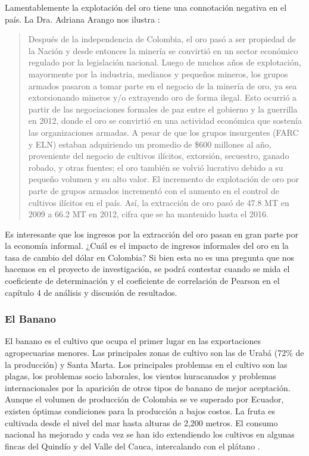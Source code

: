 Lamentablemente la explotación del oro tiene una connotación negativa en el país. La Dra. Adriana Arango nos ilustra \cite{arango_2017}:

\begin{quote}
Después de la independencia de Colombia, el oro pasó a ser propiedad de la Nación y desde entonces la minería se convirtió en un sector económico regulado por la legislación nacional. Luego de muchos años de explotación, mayormente por la industria, medianos y pequeños mineros, los grupos armados pasaron a tomar parte en el negocio de la minería de oro, ya sea extorsionando mineros y/o extrayendo oro de forma ilegal. Esto ocurrió a partir de las negociaciones formales de paz entre el gobierno y la guerrilla en 2012, donde el oro se convirtió en una actividad económica que sostenía las organizaciones armadas. A pesar de que los grupos insurgentes (FARC y ELN) estaban adquiriendo un promedio de \$600 millones al año, proveniente del negocio de cultivos ilícitos, extorsión, secuestro, ganado robado, y otras fuentes; el oro también se volvió lucrativo debido a su pequeño volumen y su alto valor. El incremento de explotación de oro por parte de grupos armados incrementó con el aumento en el control de cultivos ilícitos en el país. Así, la extracción de oro pasó de 47.8 MT en 2009 a 66.2 MT en 2012, cifra que se ha mantenido hasta el 2016.
\end{quote}

Es interesante que los ingresos por la extracción del oro pasan en gran parte por la economía informal. ¿Cuál es el impacto de ingresos informales del oro en la tasa de cambio del dólar en Colombia? Si bien esta no es una pregunta que nos hacemos en el proyecto de investigación, se podrá contestar cuando se mida el coeficiente de determinación y el coeficiente de correlación de Pearson en el capítulo 4 de análisis y discusión de resultados.

\subsubsection{El Banano}
El banano es el cultivo que ocupa el primer lugar en las exportaciones agropecuarias menores. Las principales zonas de cultivo son las de Urabá (72\% de la producción) y Santa Marta. Los principales problemas en el cultivo son las plagas, los problemas socio laborales, los vientos huracanados y problemas internacionales por la aparición de otros tipos de banano de mejor aceptación. Aunque el volumen de producción de Colombia se ve superado por Ecuador, existen óptimas condiciones para la producción a bajos costos. La fruta es cultivada desde el nivel del mar hasta alturas de 2,200 metros. El consumo nacional ha mejorado y cada vez se han ido extendiendo los cultivos en algunas fincas del Quindío y del Valle del Cauca, intercalando con el plátano \cite{bananoC}.

